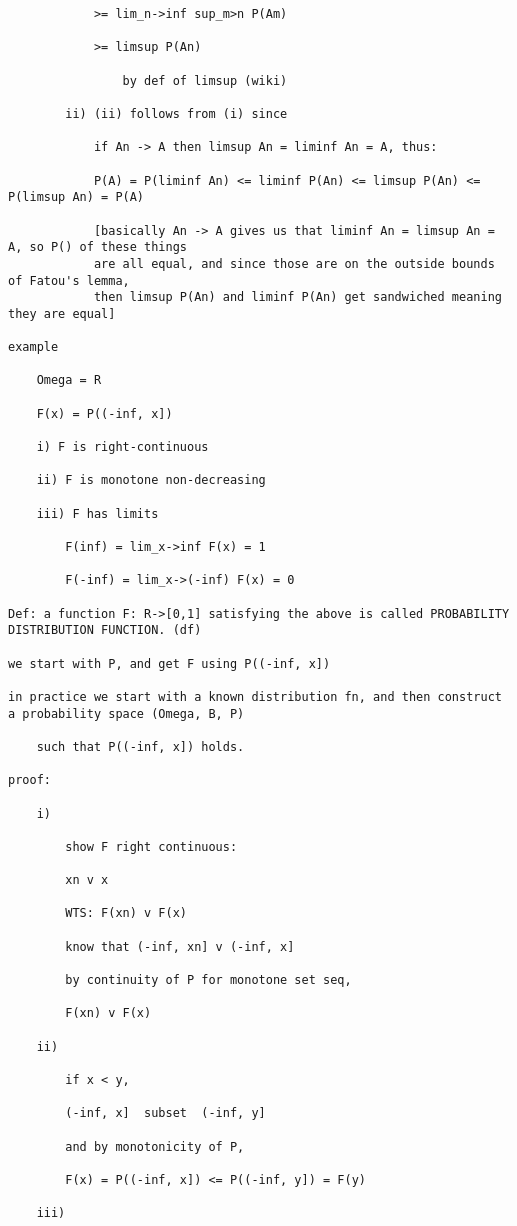 \documentclass{article}
\begin{document}
\begin{flushleft}
\begin{verbatim}
			>= lim_n->inf sup_m>n P(Am)
				
			>= limsup P(An)
			
				by def of limsup (wiki)
	
		ii) (ii) follows from (i) since 
		
			if An -> A then limsup An = liminf An = A, thus:
			
			P(A) = P(liminf An) <= liminf P(An) <= limsup P(An) <= P(limsup An) = P(A)
			
			[basically An -> A gives us that liminf An = limsup An = A, so P() of these things
			are all equal, and since those are on the outside bounds of Fatou's lemma, 
			then limsup P(An) and liminf P(An) get sandwiched meaning they are equal]
			
example

	Omega = R
	
	F(x) = P((-inf, x])
	
	i) F is right-continuous
	
	ii) F is monotone non-decreasing
	
	iii) F has limits
	
		F(inf) = lim_x->inf F(x) = 1
		
		F(-inf) = lim_x->(-inf) F(x) = 0
		
Def: a function F: R->[0,1] satisfying the above is called PROBABILITY DISTRIBUTION FUNCTION. (df)

we start with P, and get F using P((-inf, x])

in practice we start with a known distribution fn, and then construct a probability space (Omega, B, P)

	such that P((-inf, x]) holds.
		
proof:

	i)
	
		show F right continuous:
		
		xn v x
		
		WTS: F(xn) v F(x)
		
		know that (-inf, xn] v (-inf, x]
		
		by continuity of P for monotone set seq,
		
		F(xn) v F(x)

	ii) 
		
		if x < y, 
	
		(-inf, x]  subset  (-inf, y]
		
		and by monotonicity of P, 
		
		F(x) = P((-inf, x]) <= P((-inf, y]) = F(y)
		
	iii)
	

\end{verbatim}
\end{flushleft}
\end{document}
